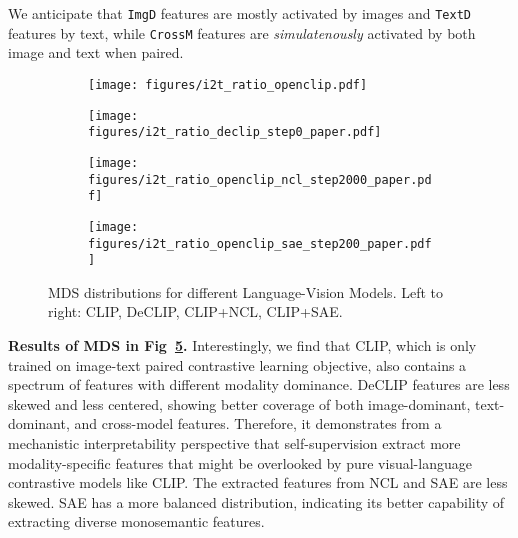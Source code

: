 We anticipate that \texttt{ImgD} features are mostly activated by images and \texttt{TextD} features by text, while \texttt{CrossM} features are  \emph{simulatenously} activated by both image and text when paired.
\begin{figure}[t]

    \centering
    \begin{subfigure}[b]{0.17\textwidth}
        \centering
        \texttt{[image: figures/i2t\_ratio\_openclip.pdf]}
        \label{fig:1}
    \end{subfigure}
    \begin{subfigure}[b]{0.17\textwidth}
        \centering
        \texttt{[image: figures/i2t\_ratio\_declip\_step0\_paper.pdf]}
        \label{fig:2}
    \end{subfigure}
    \begin{subfigure}[b]{0.17\textwidth}
        \centering
        \texttt{[image: figures/i2t\_ratio\_openclip\_ncl\_step2000\_paper.pdf]}
        \label{fig:3}
    \end{subfigure}
    \begin{subfigure}[b]{0.17\textwidth}
        \centering
        \texttt{[image: figures/i2t\_ratio\_openclip\_sae\_step200\_paper.pdf]}
        \label{fig:4}
    \end{subfigure}
    \vspace{-5mm}
    \caption{\footnotesize MDS distributions for different Language-Vision Models. Left to right: CLIP, DeCLIP, CLIP+NCL, CLIP+SAE.}
    \label{fig:four_figures}
\end{figure}
\textbf{Results of MDS in Fig~\ref{fig:four_figures}.} Interestingly, we find that    
CLIP, which is only trained on image-text paired contrastive learning objective, also contains {a spectrum of features with different modality dominance}. 
DeCLIP features are less skewed and less centered, showing better coverage of both image-dominant, text-dominant, and cross-model features. Therefore, it demonstrates from a mechanistic interpretability perspective that self-supervision extract more modality-specific features that might be overlooked by pure visual-language contrastive models like CLIP. The extracted features from NCL and SAE are less skewed. SAE has a more balanced distribution, indicating its better capability of extracting diverse monosemantic features.

